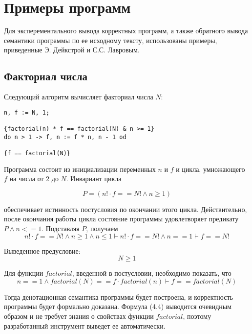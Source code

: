 \chapter{Примеры программ} \label{ch4}

Для эксперементального вывода корректных программ, а также обратного вывода семантики программы
по ее исходному тексту, использованы примеры, приведенные Э. Дейкстрой\cite{Dijkstra} и С.С. Лавровым\cite{Lavrov}.

\section{Факториал числа}
Следующий алгоритм вычисляет факториал числа $N$:
\begin{verbatim}
n, f := N, 1;

{factorial(n) * f == factorial(N) & n >= 1}
do n > 1 -> f, n := f * n, n - 1 od

{f == factorial(N)}
\end{verbatim}

Программа состоит из инициализации переменных $n$ и $f$ и цикла,
умножающего $f$ на числа от 2 до $N$. Инвариант цикла

\begin{equation}
    P = \left( n! \cdot f == N! \wedge n \geq 1 \right)
\end{equation}

обеспечивает истинность постусловия по окончании этого цикла. Действительно,
после окончания работы цикла состояние программы удовлетворяет предикату $P \wedge n <= 1$. Подставляя $P$, получаем
\begin{equation}
n! \cdot f == N! \wedge n \geq 1 \wedge n \leq 1  \vdash n! \cdot f == N! \wedge n == 1 \vdash f == N!
\end{equation}

Выведенное предусловие:
\begin{equation}
    N \geq 1
\end{equation}

Для функции $factorial$, введенной в постусловии, необходимо показать, что
\begin{equation}
    n == 1 \wedge factorial(N) == f \cdot factorial(n) \vdash f == factorial(N)
\end{equation}

Тогда денотационная семантика программы будет построена, и корректность программы
будет формально доказана. Формула (4.4) выводится очевидным образом и не требует знания о свойствах функции $factorial$,
поэтому разработанный инструмент выведет ее автоматически.

